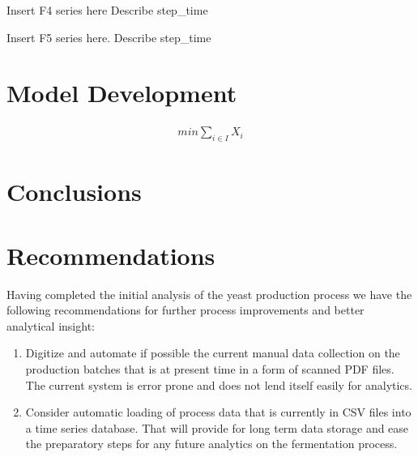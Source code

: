 \documentclass{article}
\begin{document}
Insert F4 series here
Describe step_time

Insert F5 series here.
Describe step_time

\section{Model Development}
\begin{align}
    min \sum_{i \in I}{X_i}    
\end{align}

\section{Conclusions}

\section{Recommendations}
Having completed the initial analysis of the yeast production process we have the following recommendations for further process improvements and better analytical insight:

\begin{enumerate}
\item Digitize and automate if possible the current manual data collection on the production batches that is at present time in a form of scanned PDF files. The current system is error prone and does not lend itself easily for analytics.
\item Consider automatic loading of process data that is currently in CSV files into a time series database. That will provide for long term data storage and ease the preparatory steps for any future analytics on the fermentation process.
\end{enumerate}

\listoffigures
\end{document}
